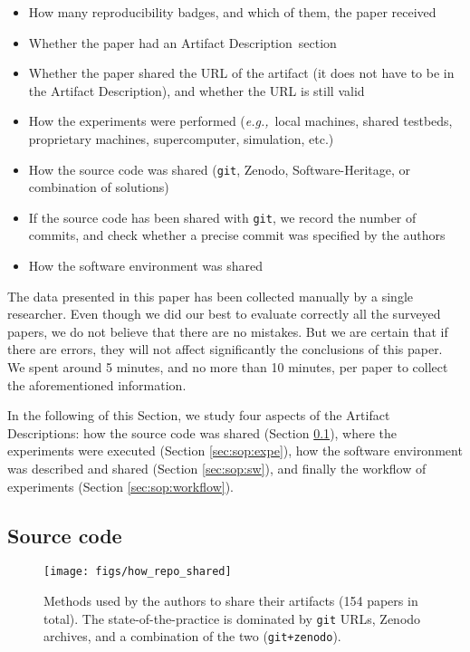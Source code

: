 \documentclass[sigconf,natbib=false]{acmart}
\newcommand{\eg}{\emph{e.g.,}}
\newcommand{\ad}{Artifact Description}
\begin{document}
\begin{itemize}
  \item How many reproducibility badges, and which of them, the paper received
  \item Whether the paper had an \ad\ section
  \item Whether the paper shared the URL of the artifact (it does not have to be in the \ad), and whether the URL is still valid
  \item How the experiments were performed (\eg\ local machines, shared testbeds, proprietary machines, supercomputer, simulation, etc.)
  \item How the source code was shared (\texttt{git}, Zenodo, Software-Heritage, or combination of solutions)
  \item If the source code has been shared with \texttt{git}, we record the number of commits, and check whether a precise commit was specified by the authors
  \item How the software environment was shared
\end{itemize}

The data presented in this paper has been collected manually by a single researcher.
Even though we did our best to evaluate correctly all the surveyed papers, we do not believe that there are no mistakes.
But we are certain that if there are errors, they will not affect significantly the conclusions of this paper.
We spent around 5 minutes, and no more than 10 minutes, per paper to collect the aforementioned information.


In the following of this Section, we study four aspects of the \ad s: how the source code was shared (Section \ref{sec:sop:src}), where the experiments were executed (Section \ref{sec:sop:expe}), how the software environment was described and shared (Section \ref{sec:sop:sw}), and finally the workflow of experiments (Section \ref{sec:sop:workflow}).

\subsection{Source code}\label{sec:sop:src}

\begin{figure}
  \centering
  \texttt{[image: figs/how\_repo\_shared]}
  \caption{Methods used by the authors to share their artifacts (154 papers in total). The state-of-the-practice is dominated by \texttt{git} URLs, Zenodo archives, and a combination of the two (\texttt{git+zenodo}).}\label{fig:how_repo_shared}
\end{figure}
\end{document}
